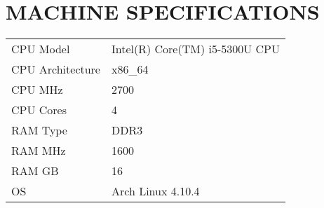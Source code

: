 \chapter{MACHINE SPECIFICATIONS}\label{app:machine}

\begin{table}[!htb]
  \centering
  \begin{tabular}{l l}
    CPU Model & Intel(R) Core(TM) i5-5300U CPU \\
    CPU Architecture & x86\_64 \\
    CPU MHz & 2700 \\
    CPU Cores & 4\\
    RAM Type & DDR3 \\
    RAM MHz & 1600 \\
    RAM GB & 16\\
    OS & Arch Linux 4.10.4
  \end{tabular}
\end{table}
